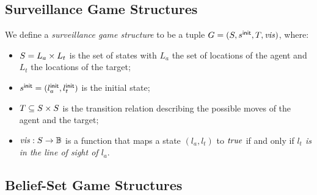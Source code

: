 \subsection{Surveillance Game Structures}
We define a \emph{surveillance game structure} to be  a tuple $G  = (S,s^{\mathsf{init}},T,\mathit{vis})$, where:
\begin{itemize}
\item $S = L_a \times L_t$ is the set of states with $L_a$ the set of locations of the agent and $L_t$ the locations of the target;
\item $s^{\mathsf{init}} = (l_a^{\mathsf{init}},l_t^{\mathsf{init}})$ is the initial state;
\item $T \subseteq S \times S$ is the transition relation describing the possible moves of the agent and the target;
\item $\mathit{vis} : S \to \mathbb{B}$ is a function that maps a state $(l_a,l_t)$ to $\mathit{true}$ if and only if\emph{ $l_t$ is in the line of sight of $l_a$}.
\end{itemize}

\begin{example}
\end{example}
\subsection{Belief-Set Game Structures}

